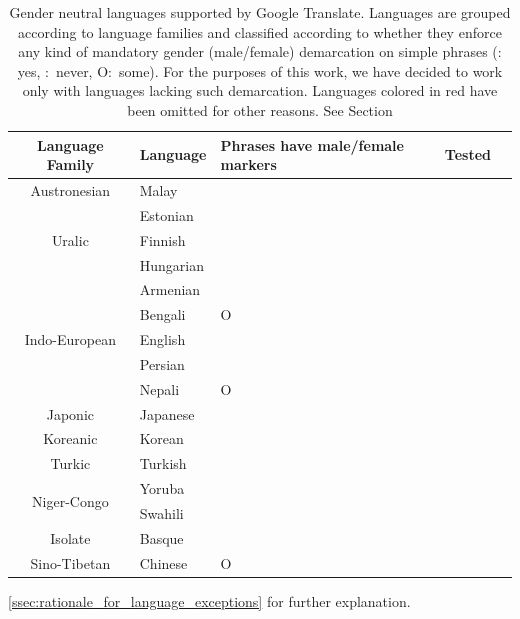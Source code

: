\documentclass[twoside,11pt]{article}
\newcommand{\xmark}{\ding{53}}%
\begin{document}
\begin{table}[H]
	\centering
	\begin{small}
		\begin{tabular}{|c|m{1.5cm}|m{1.5cm}|m{2.2cm}|m{1.5cm}|}
			\hline
			Language Family & Language & Phrases have male/female markers & Tested \\ \hline \hline
			Austronesian & Malay & \xmark & \checkmark\\ \hline
			\multirow{3}{*}{Uralic} & Estonian & \xmark & \checkmark\\
			& Finnish & \xmark & \checkmark\\
			& Hungarian & \xmark & \checkmark\\ \hline
			\multirow{5}{*}{Indo-European} & Armenian & \xmark & \checkmark\\
			& Bengali & O & \checkmark\\
			& English & \checkmark & \xmark \\
			& {\color{red}Persian} & \xmark & \checkmark\\
			& {\color{red}Nepali} & O  & \checkmark\\ \hline
			Japonic & Japanese & \xmark & \checkmark\\ \hline
			Koreanic & {\color{red}Korean} & \checkmark& \xmark\\ \hline
			Turkic & Turkish & \xmark & \checkmark\\ \hline
			\multirow{2}{*}{Niger-Congo} & Yoruba & \xmark & \checkmark\\
			& Swahili & \xmark & \checkmark\\ \hline
			Isolate & Basque & \xmark & \checkmark\\ \hline
			Sino-Tibetan & Chinese & O & \checkmark\\ \hline
		\end{tabular}
	\end{small}
	\caption{Gender neutral languages supported by Google Translate. Languages are grouped according to language families and classified according to whether they enforce any kind of mandatory gender (male/female) demarcation on simple phrases (\checkmark: yes, \xmark:~never, O:~some). For the purposes of this work, we have decided to work only with languages lacking such demarcation. Languages colored in red have been omitted for other reasons. See Section} \ref{ssec:rationale_for_language_exceptions} for further explanation.
	\label{tab:gender-neutral-languages}
\end{table}
\end{document}

